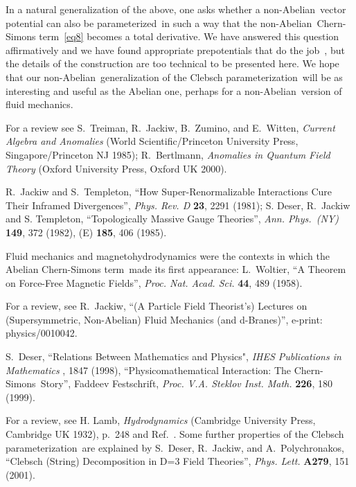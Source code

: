 \documentclass[a4paper,12pt,twoside]{article}
\newcommand{\nA}{non-Abelian}
\newcommand{\CS}{Chern-Simons}
\newcommand{\CSt}{Chern-Simons term}
\newcommand{\Cpr}{Clebsch pa\-ra\-me\-ter\-iza\-tion}
\newcommand{\prd}{para\-me\-ter\-ized}
\def\Journal#1#2#3#4{{\em #1} {\bf #2}, #3 (#4)}
\def\add#1#2#3{{\bf #1}, #2 (#3)}
\def\Book#1#2#3#4{{\em #1}  (#2, #3 #4)}
\def\PLA{Phys. Lett.} %
\def\PRD{Phys. Rev. D}
\def\AnnP{Ann. Phys.\ ({\em NY})}
\def\PNAS{Proc. Nat. Acad. Sci.}
\def\PVAS{Proc. V.A. Steklov Inst. Math.}
\begin{document}
In a natural generalization of the above, one asks whether a \nA\ vector potential
can also be \prd\ in such a way that the \nA\ \CSt~\eqref{eq8} becomes a total
derivative. We have answered this question affirmatively and we have found
appropriate prepotentials that do the job~\cite{ref10,ref13,ref14}, but the details of
the construction are too technical to be presented here. We hope that our \nA\
generalization of the \Cpr\ will be as interesting and useful as the Abelian one,
perhaps for a \nA\ version of fluid mechanics. 
 



\vspace*{-\bigskipamount}

\begin{thebibliography}{99}

\bibitem{ref6}
For a review see S.~Treiman, R.~Jackiw, B.~Zumino, and E.~Witten, \Book{Current
Algebra and Anomalies}{World Scientific/Princeton University
Press}{Singapore/Princeton NJ}{1985}; R.~Bertlmann, \Book{Anomalies in
Quantum Field Theory}{Oxford University Press}{Oxford UK}{2000}. 


\bibitem{ref7}
R.~Jackiw and S.~Templeton, ``How Super-Renormalizable Interactions Cure
Their Inframed Divergences'', \Journal{\PRD}{23}{2291}{1981}; 
S. Deser, R.~Jackiw and S. Templeton, ``Topologically Massive Gauge Theories'',
\Journal{\AnnP}{149}{372}{1982}, (E)
\add{185}{406}{1985}.

\bibitem{ref8}
Fluid mechanics and magnetohydrodynamics were the contexts in which the Abelian
\CSt\ made its first appearance: L.~Woltier, ``A Theorem on Force-Free Magnetic
Fields'',  \Journal{\PNAS}{44}{489}{1958}.


\bibitem{ref10}
For a review, see R.~Jackiw, ``(A Particle Field Theorist's) Lectures on
(Supersymmetric, Non-Abelian) Fluid Mechanics (and d-Branes)'',
e-print: physics/0010042. 

\bibitem{ref9}
S.~Deser, 
``Relations Between Mathematics and Physics",  \Journal{IHES Publications in
Mathematics}{\!}{1847}{1998},  ``Physicomathematical Interaction: The \CS\ Story'',
Faddeev Fest\-schrift,
\Journal{\PVAS}{226}{180}{1999}.



For a review, see H. Lamb, \Book{Hydrodynamics}{Cambridge University
Press}{Cambridge UK}{1932}, p.~248 and Ref.~\cite{ref10}. Some further properties of
the \Cpr\ are explained by S.~Deser, R.~Jackiw, and A.~Polychronakos, ``Clebsch
(String) Decomposition in D=3 Field Theories'', \Journal{\PLA}{A279}{151}{2001}.


\end{thebibliography}
\end{document}
